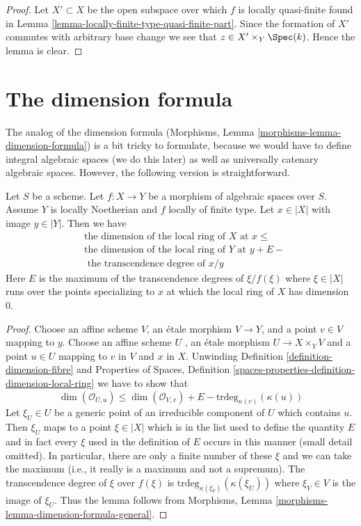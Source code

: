 \begin{proof}
Let $X' \subset X$ be the open subspace over which $f$ is locally quasi-finite
found in
Lemma \ref{lemma-locally-finite-type-quasi-finite-part}.
Since the formation of $X'$ commutes with arbitrary base change we see
that $z \in X' \times_Y \Spec(k)$. Hence the lemma is clear.
\end{proof}





\section{The dimension formula}
\label{section-dimension-formula}

\noindent
The analog of the dimension formula
(Morphisms, Lemma \ref{morphisms-lemma-dimension-formula})
is a bit tricky to formulate, because we would have to define
integral algebraic spaces (we do this later) as well as
universally catenary algebraic spaces. However, the
following version is straightforward.

\begin{lemma}
\label{lemma-dimension-formula-general}
Let $S$ be a scheme. Let $f : X \to Y$ be a morphism of algebraic
spaces over $S$. Assume $Y$ is locally Noetherian and $f$ locally
of finite type. Let $x \in |X|$ with image $y \in |Y|$.
Then we have
\begin{align*}
& \text{the dimension of the local ring of }X\text{ at }x \leq \\
& \text{the dimension of the local ring of }Y\text{ at }y + E - \\
& \text{ the transcendence degree of }x/y
\end{align*}
Here $E$ is the maximum of the transcendence degrees of $\xi/f(\xi)$
where $\xi \in |X|$ runs over the points specializing to $x$ at
which the local ring of $X$ has dimension $0$.
\end{lemma}

\begin{proof}
Choose an affine scheme $V$, an \'etale morphism $V \to Y$, and a point
$v \in V$ mapping to $y$. Choose an affine scheme $U$ , an \'etale morphism
$U \to X \times_Y V$ and a point $u \in U$ mapping to $v$ in $V$ and $x$
in $X$. Unwinding Definition \ref{definition-dimension-fibre} and
Properties of Spaces, Definition
\ref{spaces-properties-definition-dimension-local-ring}
we have to show that
$$
\dim(\mathcal{O}_{U, u}) \leq
\dim(\mathcal{O}_{V, v}) + E - \text{trdeg}_{\kappa(v)}(\kappa(u))
$$
Let $\xi_U \in U$ be a generic point of an irreducible component of
$U$ which contains $u$. Then $\xi_U$ maps to a point $\xi \in |X|$
which is in the list used to define the quantity $E$ and in fact
every $\xi$ used in the definition of $E$ occurs in this manner
(small detail omitted). In particular, there are only a finite
number of these $\xi$ and we can take the maximum (i.e., it really
is a maximum and not a supremum).
The transcendence degree of $\xi$ over $f(\xi)$ is
$\text{trdeg}_{\kappa(\xi_V)}(\kappa(\xi_U))$ where $\xi_V \in V$
is the image of $\xi_U$. Thus the lemma follows from
Morphisms, Lemma \ref{morphisms-lemma-dimension-formula-general}.
\end{proof}

